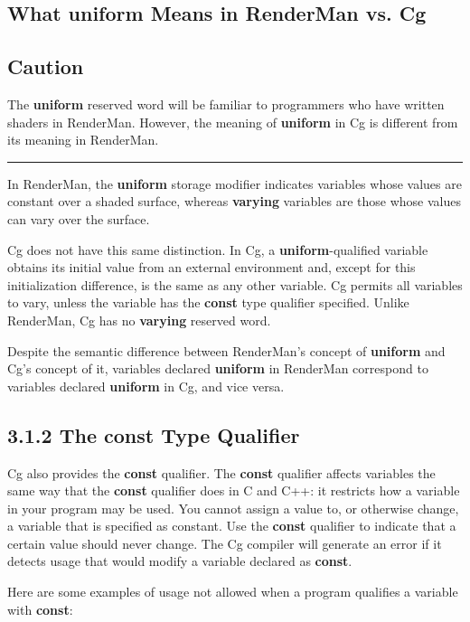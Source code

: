 \documentclass[../main.tex]{subfiles}
\begin{document}
\subsection*{What \textbf{uniform} Means in RenderMan vs. Cg}

\subsection*{Caution}

The \textbf{uniform} reserved word will be familiar to programmers who have written shaders in RenderMan. However, the meaning of \textbf{uniform} in Cg is different from its meaning in RenderMan.
\hrule

In RenderMan, the \textbf{uniform} storage modifier indicates variables whose values are constant over a shaded surface, whereas \textbf{varying} variables are those whose values can vary over the surface.

Cg does not have this same distinction. In Cg, a \textbf{uniform}-qualified variable obtains its initial value from an external environment and, except for this initialization difference, is the same as any other variable. Cg permits all variables to vary, unless the variable has the \textbf{const} type qualifier specified. Unlike RenderMan, Cg has no \textbf{varying} reserved word.

Despite the semantic difference between RenderMan's concept of \textbf{uniform} and Cg's concept of it, variables declared \textbf{uniform} in RenderMan correspond to variables declared \textbf{uniform} in Cg, and vice versa.

\subsection{3.1.2 The \textbf{const} Type Qualifier}

Cg also provides the \textbf{const} qualifier. The \textbf{const} qualifier affects variables the same way that the \textbf{const} qualifier does in C and C++: it restricts how a variable in your program may be used. You cannot assign a value to, or otherwise change, a variable that is specified as constant. Use the \textbf{const} qualifier to indicate that a certain value should never change. The Cg compiler will generate an error if it detects usage that would modify a variable declared as \textbf{const}.

Here are some examples of usage not allowed when a program qualifies a variable with \textbf{const}:
\end{document}
